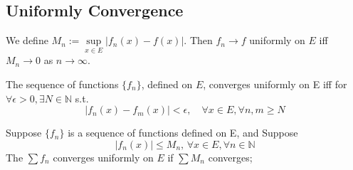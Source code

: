 \subsection{Uniformly Convergence}
\begin{theorem}
    We define  $ M_n:=\sup\limits_{x\in E }|f_n(x)-f(x)| $. Then  $ f_n\rightarrow f  $ uniformly on  $  E  $  iff  $ M_n\rightarrow
    0 $ as  $ n\rightarrow \infty  $.
\end{theorem}
\begin{theorem}
    The sequence of functions  $ \{f_n\}  $, defined on  $ E  $, converges uniformly on E iff for  $ \forall \epsilon>0,\exists N\in\mathbb{N } $ s.t.
    \begin{equation*}
        |f_n(x)-f_m(x)|<\epsilon,\quad \forall x\in E, \forall n,m\geqslant N
    \end{equation*}
    
\end{theorem}
\begin{theorem}
    Suppose  $ \{f_n\} $ is a sequence of functions defined on E, and Suppose 
    \[|f_n(x)| \leqslant M_n,\,\forall x\in E ,\forall n\in \mathbb{N }\]
    The  $ \sum f_n  $ converges uniformly on  $ E  $ if  $ \sum M_n  $ converges; 
    
\end{theorem}
